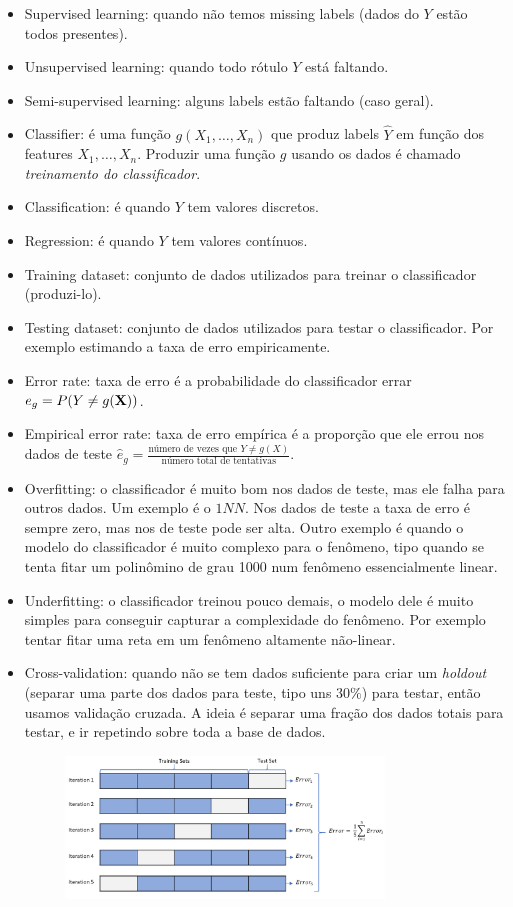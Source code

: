\documentclass[a4paper,fleqn,12pt]{article}
\begin{document}
\begin{itemize}
\item Supervised learning: quando não temos missing labels (dados do $Y$ estão todos presentes).
\item Unsupervised learning: quando todo rótulo $Y$ está faltando.
\item Semi-supervised learning: alguns labels estão faltando (caso geral).
\item Classifier: é uma função $g(X_1, \ldots, X_n)$ que produz labels $\hat{Y}$ em função dos features $X_1, \ldots, X_n$. Produzir uma função $g$ usando os dados é chamado \textit{treinamento do classificador}.
\item Classification: é quando $Y$ tem valores discretos.
\item Regression: é quando $Y$ tem valores contínuos.
\item Training dataset: conjunto de dados utilizados para treinar o classificador (produzi-lo).
\item Testing dataset: conjunto de dados utilizados para testar o classificador. Por exemplo estimando a taxa de erro empiricamente.
\item Error rate: taxa de erro é a probabilidade do classificador errar $e_g = P(Y \neq g(\vb{X}))$.
\item Empirical error rate: taxa de erro empírica é a proporção que ele errou nos dados de teste $\hat{e}_g = \frac{\text{número de vezes que }Y \neq g(X)}{\text{número total de tentativas}}$.
\item Overfitting: o classificador é muito bom nos dados de teste, mas ele falha para outros dados. Um exemplo é o $1NN$. Nos dados de teste a taxa de erro é sempre zero, mas nos de teste pode ser alta. Outro exemplo é quando o modelo do classificador é muito complexo para o fenômeno, tipo quando se tenta fitar um polinômino de grau 1000 num fenômeno essencialmente linear.
\item Underfitting: o classificador treinou pouco demais, o modelo dele é muito simples para conseguir capturar a complexidade do fenômeno. Por exemplo tentar fitar uma reta em um fenômeno altamente não-linear.
\item Cross-validation: quando não se tem dados suficiente para criar um \textit{holdout} (separar uma parte dos dados para teste, tipo uns $30\%$) para testar, então usamos validação cruzada. A ideia é separar uma fração dos dados totais para testar, e ir repetindo sobre toda a base de dados.
\begin{figure}[H]
\centering
\includegraphics[width=0.8\textwidth]{fig/crossval.png}

\end{figure}
\end{itemize}
\end{document}
